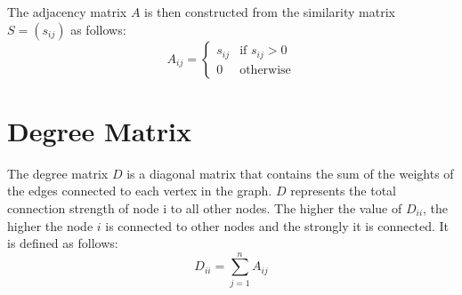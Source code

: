 \documentclass{article}
\begin{document}
The adjacency matrix $A$ is then constructed from the similarity matrix $S = (s_{ij})$ as follows:
\begin{equation}
A_{ij} = \begin{cases}
s_{ij} & \text{if } s_{ij} > 0 \\
0 & \text{otherwise}
\end{cases}
\end{equation}

\section{Degree Matrix}
\label{sec:degree}
The degree matrix $D$ is a diagonal matrix that contains the sum of the weights of the edges connected to each vertex in the graph. $D$ represents the total connection strength of node i to all other nodes. The higher the value of $D_{ii}$, the higher the node $i$ is connected to other nodes and the strongly it is connected. It is defined as follows:
\begin{equation}
D_{ii} = \sum_{j=1}^{n} A_{ij}
\end{equation}
\end{document}
